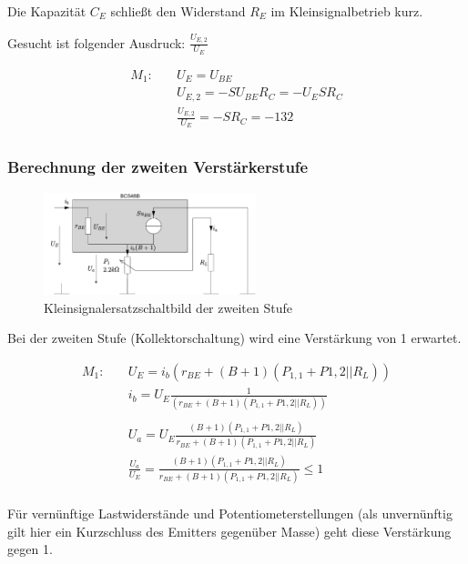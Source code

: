 Die Kapazität $C_E$ schließt den Widerstand $R_E$ im Kleinsignalbetrieb kurz.

Gesucht ist folgender Ausdruck: $\frac{U_{E,2}}{U_E}$

\begin{align*}
    M_1:& \quad U_E = U_{BE} \\
    & \quad U_{E,2} = - S U_{BE} R_C = - U_E S R_C \\
    {} & \quad  \frac{U_{E,2}}{U_E} = - S R_C = -132 \\
\end{align*}

\subsubsection{Berechnung der zweiten Verstärkerstufe}

\begin{figure}[H]
    \centering
    \includegraphics[width = 0.55\textwidth]{tex/1_Microphone/pictures/KSESB_second_stage.pdf}
    \caption{Kleinsignalersatzschaltbild der zweiten Stufe}
    \label{fig:my_label}
\end{figure}

Bei der zweiten Stufe (Kollektorschaltung) wird eine Verstärkung von 1 erwartet.

\begin{align*}
    M_1:& \quad U_E = i_b \left( r_{BE} + (B+1) (P_{1,1} + P{1,2} || R_L) \right) \\
    & \quad i_b = U_E \frac{1}{\left( r_{BE} + (B+1) (P_{1,1} + P{1,2} || R_L) \right)} \\
    \\
    & \quad U_a =  U_E \frac{(B+1) (P_{1,1} + P{1,2} || R_L)}{r_{BE} + (B+1) (P_{1,1} + P{1,2} || R_L)} \\
    & \quad \frac{U_a}{U_E} = \frac{(B+1) (P_{1,1} + P{1,2} || R_L)}{ r_{BE} + (B+1) (P_{1,1} + P{1,2} || R_L)} \leq 1\\
\end{align*}

Für vernünftige Lastwiderstände und Potentiometerstellungen (als unvernünftig gilt hier ein Kurzschluss des Emitters gegenüber Masse) geht diese Verstärkung gegen 1.

